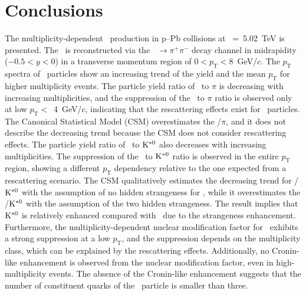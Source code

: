 
\section{Conclusions}
\label{sec:summary}

The multiplicity-dependent \fzero~production in p--Pb collisions at \snn~=~5.02~TeV is presented. The \fzero~is reconstructed via the \fzero~$\rightarrow\pi^{+}\pi^{-}$ decay channel in midrapidity ($-0.5<y<0$) in a transverse momentum region of $0<p_{\mathrm{T}}<8$~GeV/$c$. The $p_{\mathrm{T}}$ spectra of \fzero~particles show an increasing trend of the yield and the mean $p_{\mathrm{T}}$ for higher multiplicity events. The particle yield ratio of \fzero~to $\pi$ is decreasing with increasing multiplicities, and the suppression of the \fzero~to $\pi$ ratio is observed only at low $p_{\mathrm{T}}<$~4~GeV/$c$, indicating that the rescattering effects exist for \fzero~particles. The Canonical Statistical Model (CSM) overestimates the \fzero/$\pi$, and it does not describe the decreasing trend because the CSM does not consider rescattering effects. The particle yield ratio of \fzero~to $\rm{}K^{*0}$ also decreases with increasing multiplicities. The suppression of the \fzero~to $\rm{}K^{*0}$ ratio is observed in the entire $p_{\mathrm{T}}$ region, showing a different $p_{\mathrm{T}}$ dependency relative to the one expected from a rescattering scenario. The CSM qualitatively estimates the decreasing trend for \fzero/$\rm{}K^{*0}$ with the assumption of no hidden strangeness for \fzero, while it overestimates the \fzero/$\rm{}K^{*0}$ with the assumption of the two hidden strangeness. The result implies that $\rm{}K^{*0}$ is relatively enhanced compared with \fzero~due to the strangeness enhancement. Furthermore, the multiplicity-dependent nuclear modification factor for \fzero~exhibits a strong suppression at a low $p_{\mathrm{T}}$, and the suppression depends on the multiplicity class, which can be explained by the rescattering effects. Additionally, no Cronin-like enhancement is observed from the nuclear modification factor, even in high-multiplicity events. The absence of the Cronin-like enhancement suggests that the number of constituent quarks of the \fzero~particle is smaller than three.